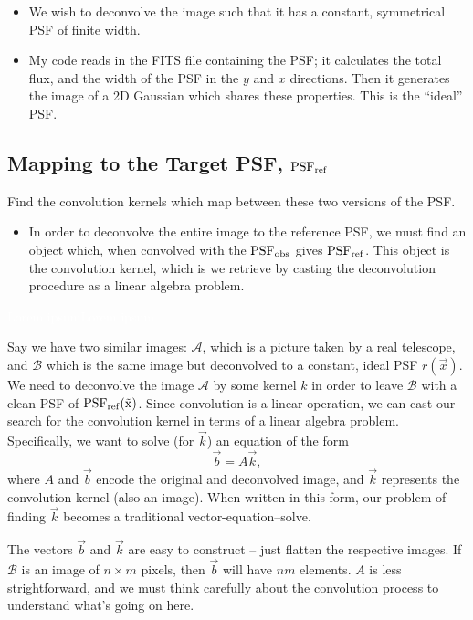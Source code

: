 \documentclass[letterpaper, 11pt]{article}
\def\psfobs{\ensuremath{\rm PSF_{obs}}\xspace}
\def\psfref{\ensuremath{\rm PSF_{ref}}\xspace}
\def\wspace{\textcolor{white}{Lorem ipsum}}
\begin{document}
\begin{itemize}
	\item We wish to deconvolve the image such that it has a constant, symmetrical PSF of finite width.
	\item My code reads in the FITS file containing the PSF; it calculates the total flux, and the width of the PSF in the $y$ and $x$ directions. Then it generates the image of a 2D Gaussian which shares these properties. This is the ``ideal'' PSF.
\end{itemize}

\subsection{Mapping to the Target PSF, \psfref}
\label{sec:kernel}


Find the convolution kernels which map between these two versions of the PSF.
\begin{itemize}
	\item In order to deconvolve the entire image to the reference PSF, we must find an object which, when convolved with the \psfobs gives \psfref. This object is the convolution kernel, which is we retrieve by casting the deconvolution procedure as a linear algebra problem.
\end{itemize}
\wspace\newline\wspace\newline

Say we have two similar images: $\mathcal{A}$, which is a picture taken by a real telescope, and $\mathcal{B}$ which is the same image but deconvolved to a constant, ideal PSF $r(\vec x)$. We need to deconvolve the image  $\mathcal{A}$ by some kernel $k$ in order to leave $\mathcal{B}$ with a clean PSF of $\psfref(\vec x)$. Since convolution is a linear operation, we can cast our search for the convolution kernel in terms of a linear algebra problem. Specifically, we want to solve (for $\vec k$) an equation of the form
\begin{equation}\label{eqn:vector}
	\vec b = A \vec k,
\end{equation}
where $A$ and $\vec b$ encode the original and deconvolved image, and $\vec k$ represents the convolution kernel (also an image). When written in this form, our problem of finding $\vec k$ becomes a traditional vector-equation--solve.

The vectors $\vec b$ and $\vec k$ are easy to construct -- just flatten the respective images. If $\mathcal B$ is an image of $n\times m$ pixels, then $\vec b$ will have $nm$ elements. $A$ is less strightforward, and we must think carefully about the convolution process to understand what's going on here.
\end{document}
